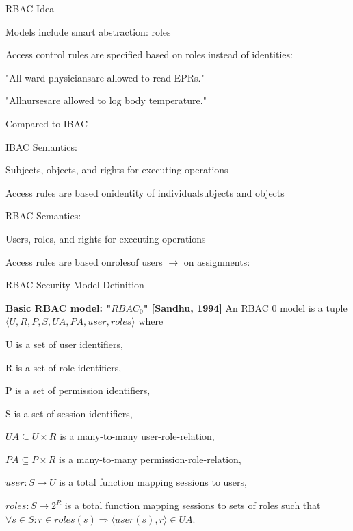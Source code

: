 \documentclass[a4paper]{article}
\renewcommand{\note}[2]{\begin{noteBox} \textbf{#1} #2 \end{noteBox}}
\begin{document}
\begin{multicols}{3}
    RBAC Idea
    \begin{itemize*}
        \item Models include smart abstraction: roles
        \item Access control rules are specified based on roles instead of identities:
        \begin{itemize*}
            \item "All ward physiciansare allowed to read EPRs."
            \item "Allnursesare allowed to log body temperature."
        \end{itemize*}
        \item Compared to IBAC
        \begin{itemize*}
            \item IBAC Semantics:
            \begin{itemize*}
                \item Subjects, objects, and rights for executing operations
                \item Access rules are based onidentity of individualsubjects and objects
            \end{itemize*}
            \item RBAC Semantics:
            \begin{itemize*}
                \item Users, roles, and rights for executing operations
                \item Access rules are based onrolesof users $\rightarrow$ on assignments:
            \end{itemize*}
        \end{itemize*}
    \end{itemize*}


    RBAC Security Model Definition
    \note{Basic RBAC model: "$RBAC_0$" [Sandhu, 1994]}{An RBAC 0 model is a tuple $⟨U,R,P,S,UA,PA,user,roles⟩$ where
    \begin{itemize*}
        \item U is a set of user identifiers,
        \item R is a set of role identifiers,
        \item P is a set of permission identifiers,
        \item S is a set of session identifiers,
        \item $UA\subseteq U\times R$ is a many-to-many user-role-relation,
        \item $PA\subseteq P\times R$ is a many-to-many permission-role-relation,
        \item $user:S\rightarrow U$ is a total function mapping sessions to users,
        \item $roles:S\rightarrow 2^R$ is a total function mapping sessions to sets of roles such that $\forall s\in S:r\in roles(s)\Rightarrow ⟨user(s),r⟩\in UA$.
    \end{itemize*}
    }


\end{multicols}
\end{document}
